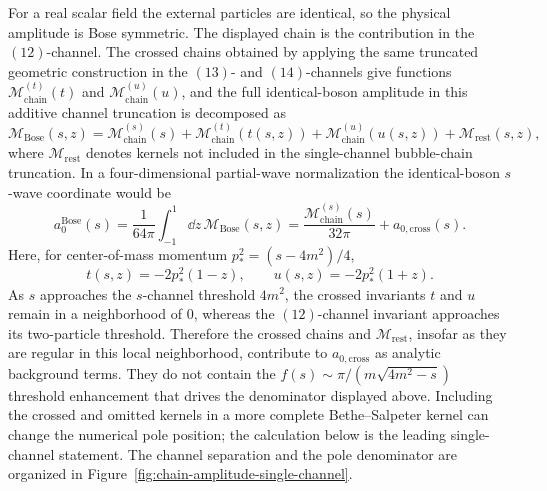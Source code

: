 For a real scalar field the external particles are identical, so the physical
amplitude is Bose symmetric.  The displayed chain is the contribution in the
\((12)\)-channel.  The crossed chains obtained by applying the same truncated
geometric construction in the \((13)\)- and \((14)\)-channels give functions
\(\mathcal M_{\mathrm{chain}}^{(t)}(t)\) and
\(\mathcal M_{\mathrm{chain}}^{(u)}(u)\), and the full identical-boson
amplitude in this additive channel truncation is decomposed as
\[
  \mathcal M_{\mathrm{Bose}}(s,z)
  =
  \mathcal M_{\mathrm{chain}}^{(s)}(s)
  +
  \mathcal M_{\mathrm{chain}}^{(t)}(t(s,z))
  +
  \mathcal M_{\mathrm{chain}}^{(u)}(u(s,z))
  +
  \mathcal M_{\mathrm{rest}}(s,z),
\]
where \(\mathcal M_{\mathrm{rest}}\) denotes kernels not included in the
single-channel bubble-chain truncation.  In a four-dimensional partial-wave
normalization the identical-boson \(s\)-wave coordinate would be
\[
  a_0^{\mathrm{Bose}}(s)
  =
  \frac{1}{64\pi}\int_{-1}^{1}\dd z\,
  \mathcal M_{\mathrm{Bose}}(s,z)
  =
  \frac{\mathcal M_{\mathrm{chain}}^{(s)}(s)}{32\pi}
  +
  a_{0,\mathrm{cross}}(s).
\]
Here, for center-of-mass momentum \(p_*^2=(s-4m^2)/4\),
\[
  t(s,z)=-2p_*^2(1-z),
  \qquad
  u(s,z)=-2p_*^2(1+z).
\]
As \(s\) approaches the \(s\)-channel threshold \(4m^2\), the crossed
invariants \(t\) and \(u\) remain in a neighborhood of \(0\), whereas the
\((12)\)-channel invariant approaches its two-particle threshold.  Therefore
the crossed chains and \(\mathcal M_{\mathrm{rest}}\), insofar as they are
regular in this local neighborhood, contribute to \(a_{0,\mathrm{cross}}\) as
analytic background terms.  They do not contain the
\(f(s)\sim\pi/(m\sqrt{4m^2-s})\) threshold enhancement that drives the
denominator displayed above.  Including the crossed and omitted kernels in a
more complete Bethe--Salpeter kernel can change the numerical pole position;
the calculation below is the leading single-channel statement.  The channel
separation and the pole denominator are organized in
Figure~\ref{fig:chain-amplitude-single-channel}.


